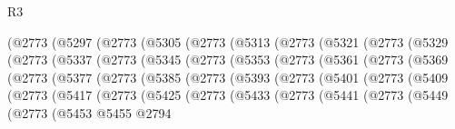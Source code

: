 \begin{lexlean}{R3}
\begin{coremodule}
          (@2773
            (@5297
              (@2773
                (@5305
                  (@2773
                    (@5313
                      (@2773
                        (@5321
                          (@2773
                            (@5329
                              (@2773
                                (@5337
                                  (@2773
                                    (@5345
                                      (@2773
                                        (@5353
                                          (@2773
                                            (@5361
                                              (@2773
                                                (@5369
                                                  (@2773
                                                    (@5377
                                                      (@2773
                                                        (@5385
                                                          (@2773
                                                            (@5393
                                                              (@2773
                                                                (@5401
                                                                  (@2773
                                                                    (@5409
                                                                      (@2773
                                                                        (@5417
                                                                          (@2773
                                                                            (@5425
                                                                              (@2773
                                                                                (@5433
                                                                                  (@2773
                                                                                    (@5441
                                                                                      (@2773
                                                                                        (@5449
                                                                                          (@2773
                                                                                            (@5453
                                                                                              @5455
                                                                                              @2794

\end{coremodule}
\end{lexlean}
